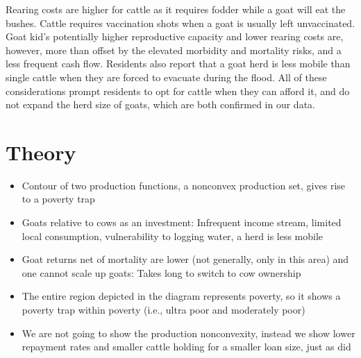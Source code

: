 	Rearing costs are higher for cattle as it requires fodder while a goat will eat the bushes. Cattle requires vaccination shots when a goat is usually left unvaccinated. Goat kid's potentially higher reproductive capacity and lower rearing costs are, however, more than offset by the elevated morbidity and mortality risks, and a less frequent cash flow. Residents also report that a goat herd is less mobile than single cattle when they are forced to evacuate during the flood. All of these considerations prompt residents to opt for cattle when they can afford it, and do not expand the herd size of goats, which are both confirmed in our data.


\section{Theory}
\label{SecTheory}

\begin{mdframed}[style={SecItemize}, frametitle={Theory}]
\begin{itemize}
\vspace{1.0ex}\setlength{\itemsep}{1.0ex}\setlength{\baselineskip}{12pt}
\item	Contour of two production functions, a nonconvex production set, gives rise to a poverty trap
\item	Goats relative to cows as an investment: Infrequent income stream, limited local consumption, vulnerability to logging water, a herd is less mobile
\item	Goat returns net of mortality are lower (not generally, only in this area) and one cannot scale up goats: Takes long to switch to cow ownership
\item	The entire region depicted in the diagram represents poverty, so it shows a poverty trap within poverty (i.e., ultra poor and moderately poor)
\item	We are not going to show the production nonconvexity, instead we show lower repayment rates and smaller cattle holding for a smaller loan size, just as \citet{BandieraBRAC2017} did
\end{itemize}
\end{mdframed}

\hspace{-3em}

